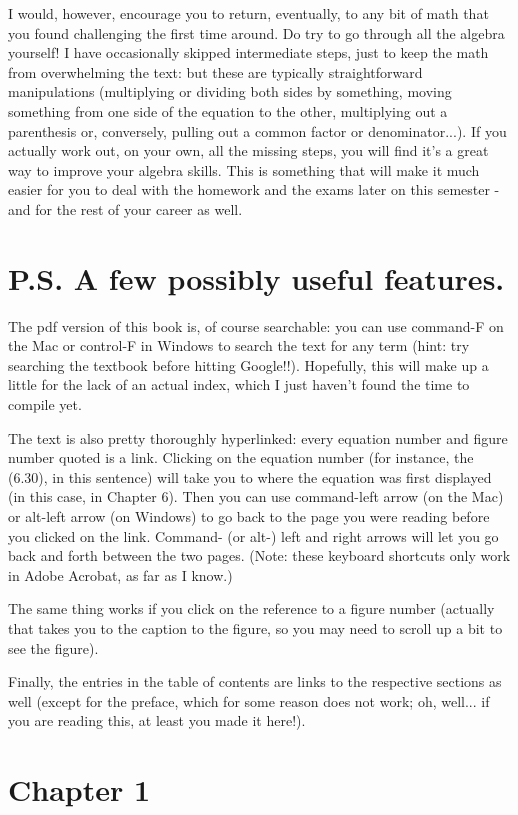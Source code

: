 \documentclass[10pt]{article}
\begin{document}
I would, however, encourage you to return, eventually, to any bit of math that you found challenging the first time around. Do try to go through all the algebra yourself! I have occasionally skipped intermediate steps, just to keep the math from overwhelming the text: but these are typically straightforward manipulations (multiplying or dividing both sides by something, moving something from one side of the equation to the other, multiplying out a parenthesis or, conversely, pulling out a common factor or denominator...). If you actually work out, on your own, all the missing steps, you will find it's a great way to improve your algebra skills. This is something that will make it much easier for you to deal with the homework and the exams later on this semester - and for the rest of your career as well.

\section*{P.S. A few possibly useful features.}
The pdf version of this book is, of course searchable: you can use command-F on the Mac or control-F in Windows to search the text for any term (hint: try searching the textbook before hitting Google!!). Hopefully, this will make up a little for the lack of an actual index, which I just haven't found the time to compile yet.

The text is also pretty thoroughly hyperlinked: every equation number and figure number quoted is a link. Clicking on the equation number (for instance, the (6.30), in this sentence) will take you to where the equation was first displayed (in this case, in Chapter 6). Then you can use command-left arrow (on the Mac) or alt-left arrow (on Windows) to go back to the page you were reading before you clicked on the link. Command- (or alt-) left and right arrows will let you go back and forth between the two pages. (Note: these keyboard shortcuts only work in Adobe Acrobat, as far as I know.)

The same thing works if you click on the reference to a figure number (actually that takes you to the caption to the figure, so you may need to scroll up a bit to see the figure).

Finally, the entries in the table of contents are links to the respective sections as well (except for the preface, which for some reason does not work; oh, well... if you are reading this, at least you made it here!).

\section*{Chapter 1}
\end{document}
